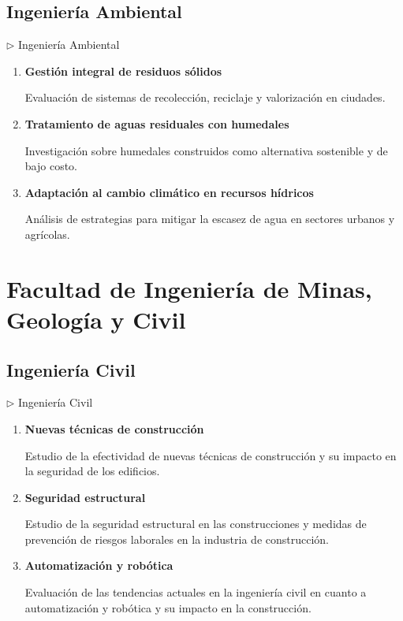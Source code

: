 \documentclass[12pt,a4paper]{article}
\begin{document}
\subsection{Ingeniería Ambiental}
\begin{careerbox}{$\triangleright$ Ingeniería Ambiental}
	\begin{enumerate}
		\item \textbf{Gestión integral de residuos sólidos}
		
		Evaluación de sistemas de recolección, reciclaje y valorización en ciudades.
		\item \textbf{Tratamiento de aguas residuales con humedales}
		
		Investigación sobre humedales construidos como alternativa sostenible y de bajo costo.
		\item \textbf{Adaptación al cambio climático en recursos hídricos}
		
		Análisis de estrategias para mitigar la escasez de agua en sectores urbanos y agrícolas.
	\end{enumerate}
\end{careerbox}

\section{Facultad de Ingeniería de Minas, Geología y Civil}

\subsection{Ingeniería Civil}

\begin{careerbox}{$\triangleright$ Ingeniería Civil}
	\begin{enumerate}
		\item \textbf{Nuevas técnicas de construcción}
		
		Estudio de la efectividad de nuevas técnicas de construcción y su impacto en la seguridad de los edificios.
		
		\item \textbf{Seguridad estructural}
		
		Estudio de la seguridad estructural en las construcciones y medidas de prevención de riesgos laborales en la industria de construcción.
		
		\item \textbf{Automatización y robótica}
		
		Evaluación de las tendencias actuales en la ingeniería civil en cuanto a automatización y robótica y su impacto en la construcción.
	\end{enumerate}
\end{careerbox}
\end{document}
